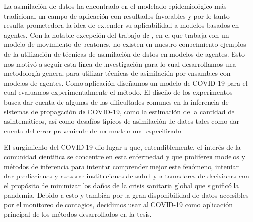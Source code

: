 La asimilación de datos ha encontrado en el modelado epidemiológico más tradicional un campo de aplicación con resultados favorables y por lo tanto resulta prometedora la idea de extender su aplicabilidad a modelos basados en agentes. Con la notable excepción del trabajo de \cite{Ward2016}, en el que trabaja con un modelo de movimiento de peatones, no existen en nuestro conocimiento ejemplos de la utilización de técnicas de asimilación de datos en modelos de agentes. Esto nos motivó a seguir esta línea de investigación para lo cual desarrollamos una metodología general para utilizar técnicas de asimilación por ensambles con modelos de agentes. Como aplicación diseñamos un modelo de COVID-19 para el cual evaluamos experimentalmente el método. El diseño de los experimentos busca dar cuenta de algunas de las dificultades comunes en la inferencia de sistemas de propagación de COVID-19, como la estimación de la cantidad de asintomáticos, así como desafíos típicos de asimilación de datos tales como dar cuenta del error proveniente de un modelo mal especificado.

El surgimiento del COVID-19 dio lugar a que, entendiblemente, el interés de la comunidad científica se concentre en esta enfermedad y que proliferen modelos y métodos de inferencia para intentar comprender mejor este fenómeno, intentar dar predicciones y asesorar instituciones de salud y a tomadores de decisiones con el propósito de minimizar los daños de la crisis sanitaria global que significó la pandemia. Debido a esto y también por la gran disponibilidad de datos accesibles por el monitoreo de contagios, decidimos usar al COVID-19 como aplicación principal de los métodos desarrollados en la tesis.


